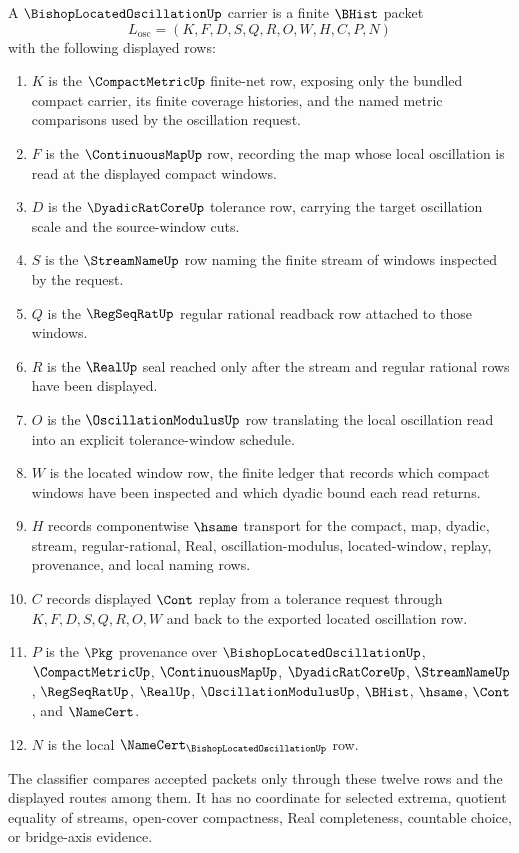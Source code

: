 \begin{definition}
\label{def:bishop-located-oscillation-carrier}
A $\BishopLocatedOscillationUp$ carrier is a finite $\BHist$ packet
$$
L_{\mathrm{osc}}=(K,F,D,S,Q,R,O,W,H,C,P,N)
$$
with the following displayed rows:
\begin{enumerate}
\item $K$ is the $\CompactMetricUp$ finite-net row, exposing only the bundled compact carrier, its finite coverage histories, and the named metric comparisons used by the oscillation request.
\item $F$ is the $\ContinuousMapUp$ row, recording the map whose local oscillation is read at the displayed compact windows.
\item $D$ is the $\DyadicRatCoreUp$ tolerance row, carrying the target oscillation scale and the source-window cuts.
\item $S$ is the $\StreamNameUp$ row naming the finite stream of windows inspected by the request.
\item $Q$ is the $\RegSeqRatUp$ regular rational readback row attached to those windows.
\item $R$ is the $\RealUp$ seal reached only after the stream and regular rational rows have been displayed.
\item $O$ is the $\OscillationModulusUp$ row translating the local oscillation read into an explicit tolerance-window schedule.
\item $W$ is the located window row, the finite ledger that records which compact windows have been inspected and which dyadic bound each read returns.
\item $H$ records componentwise $\hsame$ transport for the compact, map, dyadic, stream, regular-rational, Real, oscillation-modulus, located-window, replay, provenance, and local naming rows.
\item $C$ records displayed $\Cont$ replay from a tolerance request through $K,F,D,S,Q,R,O,W$ and back to the exported located oscillation row.
\item $P$ is the $\Pkg$ provenance over $\BishopLocatedOscillationUp$, $\CompactMetricUp$, $\ContinuousMapUp$, $\DyadicRatCoreUp$, $\StreamNameUp$, $\RegSeqRatUp$, $\RealUp$, $\OscillationModulusUp$, $\BHist$, $\hsame$, $\Cont$, and $\NameCert$.
\item $N$ is the local $\NameCert_{\BishopLocatedOscillationUp}$ row.
\end{enumerate}
The classifier compares accepted packets only through these twelve rows and the displayed routes among them. It has no coordinate for selected extrema, quotient equality of streams, open-cover compactness, Real completeness, countable choice, or bridge-axis evidence.
\end{definition}

